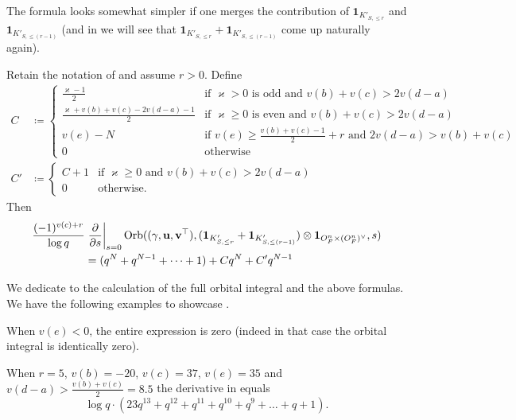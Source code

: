 The formula looks somewhat simpler if one merges the contribution of
$\mathbf{1}_{K'_{S, \le r}}$ and $\mathbf{1}_{K'_{S, \le (r-1)}}$
(and in  we will see that
$\mathbf{1}_{K'_{S, \le r}} + \mathbf{1}_{K'_{S, \le (r-1)}}$
come up naturally again).
\begin{corollary}
  \label{cor:semi_lie_combo}
  Retain the notation of  and assume $r > 0$.
  Define
  \begin{align*}
    C &\coloneqq
    \begin{cases}
      \frac{\varkappa-1}{2}
        & \text{if } \varkappa > 0 \text{ is odd}
          \text{ and } v(b) + v(c) > 2v(d-a)  \\
      \frac{\varkappa+v(b)+v(c)-2v(d-a)-1}{2}
        & \text{if } \varkappa \ge 0 \text{ is even}
          \text{ and } v(b) + v(c) > 2v(d-a)  \\
      v(e) - N
        & \text{if } v(e) \ge \frac{v(b)+v(c)-1}{2} + r
        \text{ and } 2v(d-a) > v(b) + v(c) \\
      0 & \text{otherwise}
    \end{cases} \\
    C' &\coloneqq
    \begin{cases}
      C + 1 & \text{if } \varkappa \ge 0 \text{ and } v(b)+v(c) > 2v(d-a) \\
      0 & \text{otherwise}.
    \end{cases}
  \end{align*}
  Then
  \begin{align*}
    \frac{(-1)^{v(c)+r}}{\log q} &\left. \pdv{}{s} \right\rvert_{s=0}
    \operatorname{Orb}({(\gamma, \mathbf u, \mathbf v^\top)}, (\mathbf{1}_{K'_{S, \le r}} + \mathbf{1}_{K'_{S, \le (r-1)}}) \otimes \mathbf{1}_{O_F^n \times (O_F^n)^\vee}, s) \\
    &= (q^N + q^{N-1} + \dots + 1) + C q^N + C' q^{N-1}
  \end{align*}
\end{corollary}

We dedicate  to the calculation
of the full orbital integral and the above formulas.
We have the following examples to showcase .

\begin{example}
  When $v(e) < 0$, the entire expression is zero
  (indeed in that case the orbital integral is identically zero).
\end{example}

\begin{example}
  When $r=5$, $v(b) = -20$, $v(c) = 37$, $v(e) = 35$ and $v(d-a) > \frac{v(b)+v(c)}{2} = 8.5$
  the derivative in  equals
  \[ \log q \cdot (23q^{13} + q^{12} + q^{11} + q^{10} + q^9 + \dots + q + 1). \]
\end{example}

